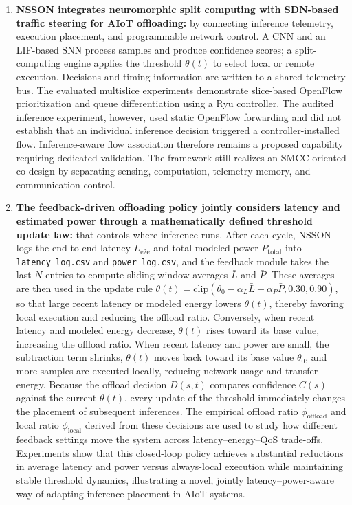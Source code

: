 \documentclass[journal]{IEEEtran}
\begin{document}
\begin{enumerate}
\item  \textbf{NSSON integrates neuromorphic split computing with SDN-based traffic steering for AIoT offloading:} by connecting inference telemetry, execution placement, and programmable network control. A CNN and an LIF-based SNN process samples and produce confidence scores; a split-computing engine applies the threshold $\theta(t)$ to select local or remote execution. Decisions and timing information are written to a shared telemetry bus. The evaluated multislice experiments demonstrate slice-based OpenFlow prioritization and queue differentiation using a Ryu controller. The audited inference experiment, however, used static OpenFlow forwarding and did not establish that an individual inference decision triggered a controller-installed flow. Inference-aware flow association therefore remains a proposed capability requiring dedicated validation. The framework still realizes an SMCC-oriented co-design by separating sensing, computation, telemetry memory, and communication control. 
\item  \textbf{The feedback-driven offloading policy jointly considers latency and estimated power through a mathematically defined threshold update law:} that controls where inference runs. After each cycle, NSSON logs the end-to-end latency $L_{\text{e2e}}$ and total modeled power $P_{\text{total}}$ into \texttt{latency\_log.csv} and \texttt{power\_log.csv}, and the feedback module takes the last $N$ entries to compute sliding-window averages $\bar{L}$ and $\bar{P}$. These averages are then used in the update rule $\theta(t) = \mathrm{clip}\!\left(\theta_0 - \alpha_L \bar{L} - \alpha_P \bar{P}, 0.30, 0.90\right)$, so that large recent latency or modeled energy lowers $\theta(t)$, thereby favoring local execution and reducing the offload ratio. Conversely, when recent latency and modeled energy decrease, $\theta(t)$ rises toward its base value, increasing the offload ratio. When recent latency and power are small, the subtraction term shrinks, $\theta(t)$ moves back toward its base value $\theta_0$, and more samples are executed locally, reducing network usage and transfer energy. Because the offload decision $D(s,t)$ compares confidence $C(s)$ against the current $\theta(t)$, every update of the threshold immediately changes the placement of subsequent inferences. The empirical offload ratio $\phi_{\text{offload}}$ and local ratio $\phi_{\text{local}}$ derived from these decisions are used to study how different feedback settings move the system across latency–energy–QoS trade-offs. Experiments show that this closed-loop policy achieves substantial reductions in average latency and power versus always-local execution while maintaining stable threshold dynamics, illustrating a novel, jointly latency–power-aware way of adapting inference placement in AIoT systems.
\end{enumerate}
\end{document}
